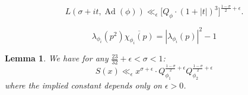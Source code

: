 \documentclass[10pt,a4paper]{amsart}
\newtheorem{lemma}{Lemma}
\newcommand{\Ad}{\operatorname{Ad}}
\begin{document}
\begin{equation}\label{convexitybound}
    L(\sigma + it, \Ad(\phi)) \ll_{\epsilon} \big[Q_{\phi}\cdot (1 + |t|)^3\big]^{\frac{1-\sigma}{2} + \epsilon}.
\end{equation}

\begin{equation}\label{>3atp^2}
    \lambda_{\phi_i}(p^2)\overline{\chi_{\phi_i}(p)} = |\lambda_{\phi_i}(p)|^2 - 1
\end{equation}

\begin{lemma}\label{UpperBoundforS(x)}
    We have for any $\frac{23}{32} + \epsilon< \sigma < 1$: 
    \[
        S(x) \ll_{\epsilon} x^{\sigma+\epsilon}\cdot Q_{\phi_1}^{\frac{1-\sigma}{2}+\epsilon}Q_{\phi_2}^{\frac{1-\sigma}{2}+\epsilon}
    \]
    where the implied constant depends only on $\epsilon > 0$.
\end{lemma}
\end{document}
